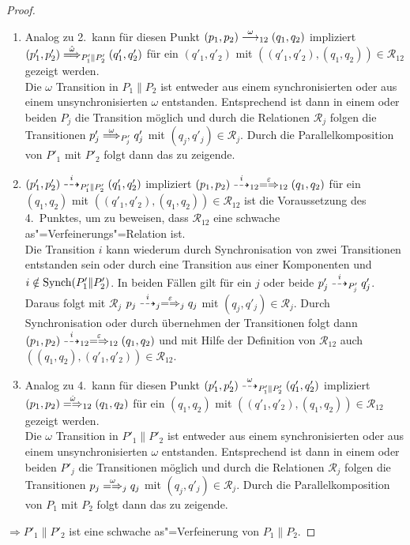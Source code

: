 \begin{proof}
\begin{enumerate}

    \item Analog zu 2.\ kann für diesen Punkt $(p_1,p_2) \must[\omega]_{12}
      (q_1,q_2)$ impliziert $(p'_1,p'_2) \weakmust[\hat{\omega}]_{P'_1\|P'_2}
      (q'_1,q'_2)$ für ein $(q'_1,q'_2)$ mit $((q'_1,q'_2),(q_1,q_2)) \in
      \mathcal{R}_{12}$ gezeigt werden.\\
      Die $\omega$ Transition in $P_1\|P_2$ ist entweder aus einem
      synchronisierten oder aus einem unsynchronisierten $\omega$ entstanden.
      Entsprechend ist dann in einem oder beiden $P_j$ die Transition möglich
      und durch die Relationen $\mathcal{R}_j$ folgen die Transitionen $p'_j
      \weakmust[\omega]_{P'_j} q'_j$ mit $(q_j,q'_j)\in\mathcal{R}_j$. Durch
      die Parallelkomposition von $P'_1$ mit $P'_2$ folgt dann das zu zeigende.
    \item $(p'_1,p'_2)\may[i]_{P'_1\|P'_2}(q'_1,q'_2)$ impliziert $(p_1,p_2)
      \may[i]_{12} \weakmay[\varepsilon]_{12} (q_1,q_2)$ für ein $(q_1,q_2)$
      mit $((q'_1,q'_2),(q_1,q_2))\in\mathcal{R}_{12}$ ist die Voraussetzung
      des 4.\ Punktes, um zu beweisen, dass $\mathcal{R}_{12}$ eine schwache
      as"=Verfeinerungs"=Relation ist.\\
      Die Transition $i$ kann wiederum durch
      Synchronisation von zwei Transitionen entstanden sein oder durch eine
      Transition aus einer Komponenten und $i\notin\mathrm{Synch} (P'_1\|P'_2)$. In
      beiden Fällen gilt für ein $j$ oder beide $p'_j\may[i]_{P'_j}q'_j$.
      Daraus folgt mit $\mathcal{R}_j$ $p_j \may[i]_j \weakmay[\varepsilon]_j
      q_j$ mit $(q_j,q'_j)\in\mathcal{R}_j$. Durch Synchronisation oder durch übernehmen der
      Transitionen folgt dann $(p_1,p_2) \may[i]_{12} \weakmay[\varepsilon]_{12}
      (q_1,q_2)$ und mit Hilfe der Definition von $\mathcal{R}_{12}$ auch
      $((q_1,q_2),(q'_1,q'_2))\in\mathcal{R}_{12}$.
    \item Analog zu 4.\ kann für diesen Punkt $(p'_1,p'_2)
      \may[\omega]_{P'_1\|P'_2} (q'_1,q'_2)$ impliziert $(p_1,p_2)
      \weakmay[\hat{\omega}]_{12} (q_1,q_2)$ für ein $(q_1,q_2)$ mit
      $((q'_1,q'_2),(q_1,q_2))\in\mathcal{R}_{12}$ gezeigt werden.\\
      Die $\omega$ Transition in $P'_1\|P'_2$ ist entweder aus einem
      synchronisierten oder aus einem unsynchronisierten $\omega$ entstanden.
      Entsprechend ist dann in einem oder beiden $P'_j$ die Transitionen
      möglich und durch die Relationen $\mathcal{R}_j$ folgen die Transitionen
      $p_j \weakmay[\omega]_j q_j$ mit $(q_j,q'_j)\in\mathcal{R}_j$. Durch
      die Parallelkomposition von $P_1$ mit $P_2$ folgt dann das zu zeigende.
  \end{enumerate}
  $\Rightarrow P'_1\|P'_2$ ist eine schwache as"=Verfeinerung von $P_1\|P_2$.
\end{proof}

